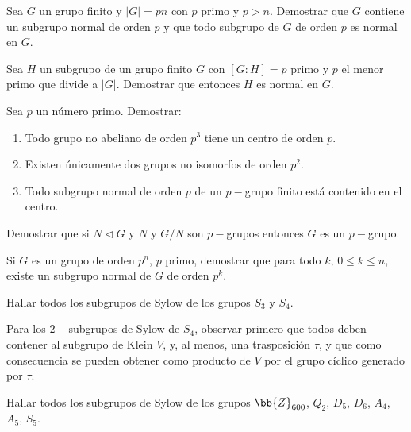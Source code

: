 \begin{ejercicio}\label{ej:6.15}
    Sea $G$ un grupo finito y $|G| = pn$ con $p$ primo y $p > n$. Demostrar que $G$ contiene un subgrupo normal de orden $p$ y que todo subgrupo de $G$ de orden $p$ es normal en $G$.
\end{ejercicio}

\begin{ejercicio}\label{ej:6.16}
    Sea $H$ un subgrupo de un grupo finito $G$ con $[G : H] = p$ primo y $p$ el menor primo que divide a $|G|$. Demostrar que entonces $H$ es normal en $G$.
\end{ejercicio}

\begin{ejercicio}\label{ej:6.17}
    Sea $p$ un número primo. Demostrar:
    \begin{enumerate}
        \item Todo grupo no abeliano de orden $p^3$ tiene un centro de orden $p$.
        \item Existen únicamente dos grupos no isomorfos de orden $p^2$.
        \item Todo subgrupo normal de orden $p$ de un $p-$grupo finito está contenido en el centro.
    \end{enumerate}
\end{ejercicio}

\begin{ejercicio}\label{ej:6.18}
    Demostrar que si $N\lhd G$ y $N$ y $G/N$ son $p-$grupos entonces $G$ es un $p-$grupo.
\end{ejercicio}

\begin{ejercicio}\label{ej:6.19}
    Si $G$ es un grupo de orden $p^n$, $p$ primo, demostrar que para todo $k$, $0 \leq k \leq n$, existe un subgrupo normal de $G$ de orden $p^k$.
\end{ejercicio}

\begin{ejercicio}\label{ej:6.20}
    Hallar todos los subgrupos de Sylow de los grupos $S_3$ y $S_4$.
    \begin{observacion}
        Para los $2-$subgrupos de Sylow de $S_4$, observar primero que todos deben contener al subgrupo de Klein $V$, y, al menos, una trasposición $\tau$, y que como consecuencia se pueden obtener como producto de $V$ por el grupo cíclico generado por $\tau$.
    \end{observacion}
\end{ejercicio}

\begin{ejercicio}\label{ej:6.21}
    Hallar todos los subgrupos de Sylow de los grupos $\bb{Z}_{600}$, $Q_2$, $D_5$, $D_6$, $A_4$, $A_5$, $S_5$.
\end{ejercicio}

